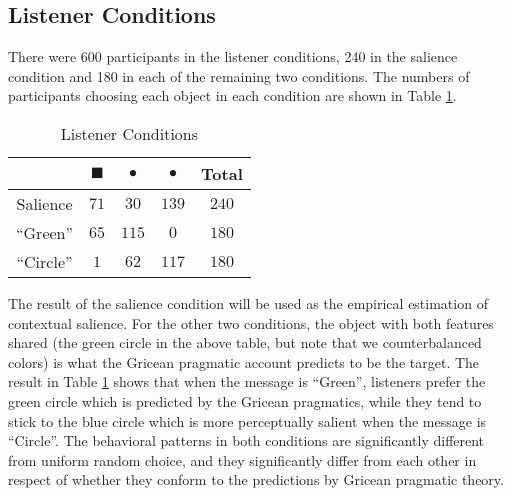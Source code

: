 \subsection{Listener Conditions}

There were 600 participants in the listener conditions, 240 in the salience condition and 180 in each of the remaining two conditions. The numbers of participants choosing each object in each condition are shown in Table \ref{table:listener}. 

\begin{table}[htb] 
  \caption{Listener Conditions}
  \centering
\begin{tabular}{c|cccc}
   & \quad \textcolor{green!65}{\Large{$\blacksquare$}}&  \textcolor{green!65}{\Huge{$\bullet$}}& \textcolor{blue!65}{\Huge{$\bullet$}} & Total\\ 
     \hline
 Salience   \quad  & \quad  $71$      \quad    &   $30$    \quad     & $139$ \quad     & $240$      \\
 ``Green''   \quad  & \quad  $65$      \quad    &   $115$    \quad     & $0$ \quad     & $180$     \\
 ``Circle''   &  \quad $1$        &    $62$        & $117$ \quad     & $180$
  \end{tabular}

  \label{table:listener}
\end{table}

The result of the salience condition will be used as the empirical estimation of contextual salience. For the other two conditions, the object with both features shared (the green circle in the above table, but note that we counterbalanced colors) is what the Gricean pragmatic account predicts to be the target. The result in Table \ref{table:listener} shows that when the message is ``Green'', listeners prefer the green circle which is predicted by the Gricean pragmatics, while they tend to stick to the blue circle which is more perceptually salient when the message is ``Circle''. The behavioral patterns in both conditions are significantly different from uniform random choice, and they significantly differ from each other in respect of whether they conform to the predictions by Gricean pragmatic theory.

